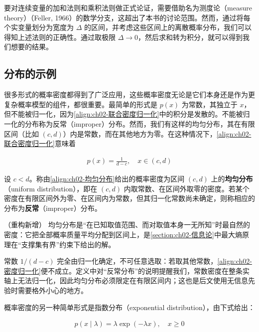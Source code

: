 \documentclass[../../main.tex]{subfiles}
\begin{document}
要对连续变量的加和法则和乘积法则做正式论证，需要借助名为测度论（measure theory）（Feller, 1966）的数学分支，这超出了本书的讨论范围。然而，通过将每个实变量划分为宽度为 $\Delta$ 的区间，并考虑这些区间上的离散概率分布，我们可以得知上述法则的正确性。通过取极限 $\Delta\to0$，然后求和转为积分，就可以得到我们想要的结果。

\subsection{分布的示例}\label{subsection:ch02-分布的示例}

很多形式的概率密度都得到了广泛应用，这些概率密度无论是它们本身还是作为更复杂概率模型的组件，都很重要。最简单的形式是 $p(x)$ 为常数，其独立于 $x$，但不能被归一化，因为\eqref{align:ch02-联合密度归一化}中的积分是发散的。不能被归一化的分布称为反常（improper）分布。然而，我们有这样的均匀分布，其在有限区间（比如 $(c,d)$）内是常数，而在其他地方为零。在这种情况下，\eqref{align:ch02-联合密度归一化}意味着

\begin{align}
  p(x) = \frac{1}{d-c}, \quad x\in(c,d)
  \label{align:ch02-均匀分布}
\end{align}

\begin{definition}[均匀分布]\label{definition:ch02-均匀分布}
设 $c<d$。称由\eqref{align:ch02-均匀分布}给出的概率密度为区间 $(c,d)$ 上的\textbf{均匀分布}（uniform distribution），即在 $(c,d)$ 内取常数、在区间外取零的密度。若某个密度在有限区间外为零、在区间内为常数，但其归一化常数尚未确定，则称相应的分布为\textbf{反常}（improper）分布。
\end{definition}

\begin{remark}（重构新增）
均匀分布是“在已知取值范围、而对取值本身一无所知”时最自然的密度：它把全部概率质量平均分配到区间上，是\cref{section:ch02-信息论}中最大熵原理在“支撑集有界”约束下给出的解。

常数 $1/(d-c)$ 完全由归一化确定，不可任意选取：若取其他常数，\eqref{align:ch02-密度归一化}便不成立。定义中对“反常分布”的说明提醒我们，常数密度在整条实轴上无法归一化，因此均匀分布必须限定在有限区间内；这也是后文使用无信息先验时需要格外小心的地方。
\end{remark}

概率密度的另一种简单形式是指数分布（exponential distribution），由下式给出：

\begin{align}
  p(x\mid\lambda) = \lambda\exp(-\lambda x), \quad x\geqslant 0
  \label{align:ch02-指数分布}
\end{align}
\end{document}
